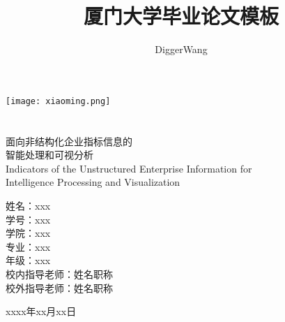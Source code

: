 \documentclass[14pt,a4paper]{xmuthesis}
\title{厦门大学毕业论文模板}
\author{DiggerWang}
\begin{document}
\begin{center}  %
\texttt{[image: xiaoming.png]}\\
\vspace{1.6cm}
\\
\vspace{0.2cm}
\\
\vspace{0.7cm}
\huge{面向非结构化企业指标信息的\\智能处理和可视分析}\\
\vspace{0.4cm}
\heiti\Large{Indicators of the Unstructured Enterprise Information for\\ Intelligence Processing and Visualization}\\
\vspace{1cm}
\end{center}
\large
\begin{flushleft}
    \hspace{8em}姓\hspace{2em}名：\hspace{1em}xxx\\[0.5em]
    \hspace{8em}学\hspace{2em}号：\hspace{1em}xxx\\[0.5em]
    \hspace{8em}学\hspace{2em}院：\hspace{1em}xxx\\[0.5em]
    \hspace{8em}专\hspace{2em}业：\hspace{1em}xxx\\[0.5em]
    \hspace{8em}年\hspace{2em}级：\hspace{1em}xxx\\[0.5em]
    \hspace{6em}校内指导老师：\hspace{2em}姓名\hspace{2em}职称\\[0.5em]
    \hspace{6em}校外指导老师：\hspace{2em}姓名\hspace{2em}职称
\end{flushleft}
\vspace{0.8cm}
\begin{center}
    xxxx年xx月xx日
\end{center}
\thispagestyle{empty}
\addtocounter{pseudopage}{-1}
\clearpage
\end{document}
